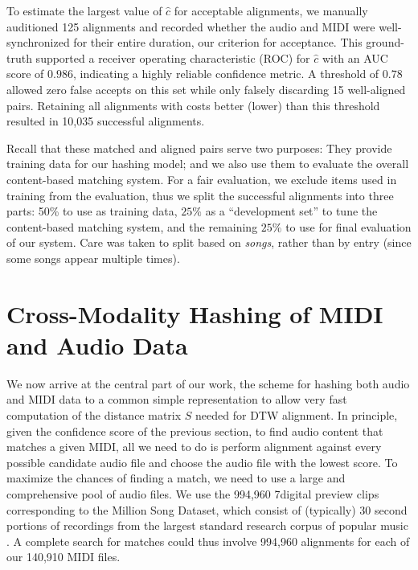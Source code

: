 \documentclass{article}
\begin{document}
To estimate the largest value of $\hat{c}$ for acceptable alignments, we manually auditioned 125 alignments and recorded whether the audio and MIDI were well-synchronized for their entire duration, our criterion for acceptance.
This ground-truth supported a receiver operating characteristic (ROC) for $\hat{c}$ with an AUC score of $0.986$, indicating a highly reliable confidence metric.
A threshold of $0.78$ allowed zero false accepts on this set while only falsely discarding 15 well-aligned pairs.
Retaining all alignments with costs better (lower) than this threshold resulted in 10,035 successful alignments.

Recall that these matched and aligned pairs serve two purposes: They provide training data for our hashing model; and we also use them to evaluate the overall content-based matching system.
For a fair evaluation, we exclude items used in training from the evaluation, thus we split the successful alignments into three parts: 50\% to use as training data, $25\%$ as a ``development set'' to tune the content-based matching system, and the remaining $25\%$ to use for final evaluation of our system.
Care was taken to split based on \textit{songs}, rather than by entry (since some songs appear multiple times).

\section{Cross-Modality Hashing of MIDI and Audio Data}
\label{sec:hashing}

We now arrive at the central part of our work, the scheme for hashing both audio and MIDI data to a  common simple representation to allow very fast computation of the distance matrix $S$ needed for DTW alignment.
In principle, given the confidence score of the previous section, to find audio content that matches a given MIDI, all we need to do is perform alignment against every possible candidate audio file and choose the audio file with the lowest score.
To maximize the chances of finding a match, we need to use a large and comprehensive pool of audio files.
We use the 994,960 7digital preview clips corresponding to the Million Song Dataset, which consist of (typically) 30 second portions of recordings from the largest standard research corpus of popular music \cite{schindler2012facilitating}.
A complete search for matches could thus involve 994,960 alignments for each of our 140,910 MIDI files.
\end{document}

